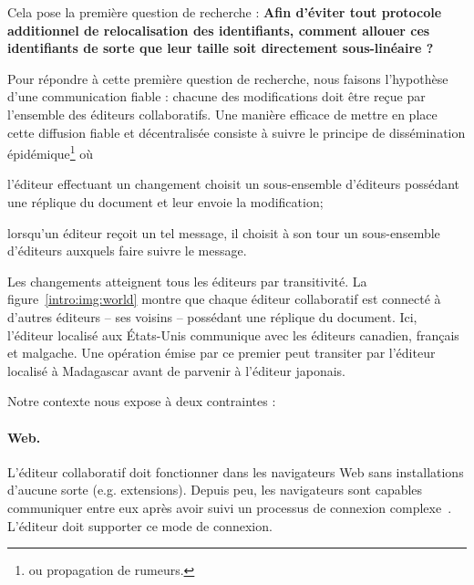 Cela pose la première question de recherche : \textbf{Afin d'éviter tout
  protocole additionnel de relocalisation des identifiants, comment allouer ces
  identifiants de sorte que leur taille soit directement sous-linéaire ?}

Pour répondre à cette première question de recherche, nous faisons l'hypothèse
d'une communication fiable : chacune des modifications doit être reçue par
l'ensemble des éditeurs collaboratifs.
Une manière efficace de mettre en place cette diffusion fiable et décentralisée
consiste à suivre le principe de dissémination épidémique\footnote{ou propagation
  de rumeurs.}  où
\begin{inparaenum}[(i)]
\item l'éditeur effectuant un changement choisit un sous-ensemble d'éditeurs
  possédant une réplique du document et leur envoie la modification;
\item lorsqu'un éditeur reçoit un tel message, il choisit à son tour un
  sous-ensemble d'éditeurs auxquels faire suivre le message.
\end{inparaenum}
Les changements atteignent tous les éditeurs par transitivité.
La figure~\ref{intro:img:world} montre que chaque éditeur collaboratif est
connecté à d'autres éditeurs -- ses voisins -- possédant une réplique du
document. Ici, l'éditeur localisé aux États-Unis communique avec les éditeurs
canadien, français et malgache.
Une opération émise par ce premier peut transiter par l'éditeur localisé à
Madagascar avant de parvenir à l'éditeur japonais. 

\noindent Notre contexte nous expose à deux contraintes :

\paragraph{Web.} L'éditeur collaboratif doit fonctionner dans les navigateurs
Web sans installations d'aucune sorte (e.g. extensions). Depuis peu, les
navigateurs sont capables communiquer entre eux après avoir suivi un processus
de connexion complexe~\cite{webrtc}. L'éditeur doit supporter ce mode de
connexion.

